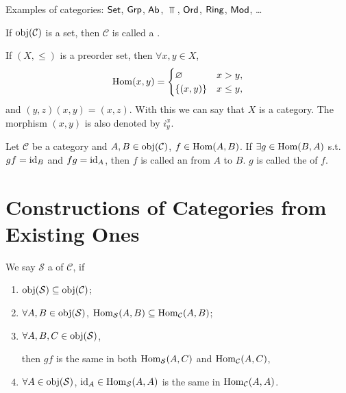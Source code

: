\documentclass[openany, a5paper]{book}
\begin{document}
Examples of categories: $\operatorname{\mathsf{Set}}$, $\operatorname{\mathsf{Grp}}$, $\operatorname{\mathsf{Ab}}$, $\Top$, $\operatorname{\mathsf{Ord}}$, $\operatorname{\mathsf{Ring}}$, $\operatorname{\mathsf{Mod}}$, \ldots

If $\operatorname{obj}(\mathcal C)$ is a set, 
then $\mathcal C$ is called a .

If $(X, \leq)$ is a preorder set, then $\forall x, y \in X$, 
\begin{equation}\label{eq: preorder morphism}
	\operatorname{Hom}(x, y) = 
	\begin{cases}
		\varnothing & x > y,
		\\
		\{(x, y)\} & x \leq y,
	\end{cases}
\end{equation}
and $(y, z) (x, y) = (x, z)$.
With this we can say that $X$ is a category.
The morphism $(x, y)$ is also denoted by $i^x_y$.

\begin{definition}[Isomorphism]
	Let $\mathcal C$ be a category and $A, B \in \operatorname{obj}(\mathcal C)$, $f \in \operatorname{Hom}(A, B)$.
	If $\exists g \in \operatorname{Hom}(B, A)$ s.t.\ $gf = \operatorname{id}_B$ and $fg = \operatorname{id}_A$, then $f$ is called an  from $A$ to $B$. 
	$g$ is called the  of $f$.
\end{definition}

\section{Constructions of Categories from Existing Ones}

\begin{definition}[Subcategory]
	We say $\mathcal S$ a  of $\mathcal C$, if
	\begin{enumerate}[label=(\roman*)]
		\item $\operatorname{obj}(\mathcal S) \subseteq \operatorname{obj}(\mathcal C)$;
		\item $\forall A, B \in \operatorname{obj}(\mathcal S)$, $\operatorname{Hom}_{\mathcal S}(A, B) \subseteq \operatorname{Hom}_{\mathcal C}(A, B)$;
		\item $\forall A, B, C \in \operatorname{obj}(\mathcal S)$, 
		\begin{center}
		\end{center}
		then $gf$ is the same in both $\operatorname{Hom}_{\mathcal S}(A, C)$ and $\operatorname{Hom}_{\mathcal C}(A, C)$,
		\item $\forall A \in \operatorname{obj}(\mathcal S)$, 
		$\operatorname{id}_A \in \operatorname{Hom}_{\mathcal S}(A, A)$ is the same in $\operatorname{Hom}_{\mathcal C}(A, A)$.
	\end{enumerate}
\end{definition}
\end{document}
